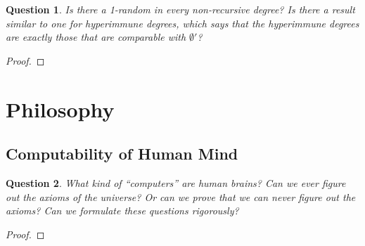 \documentclass{article}
\newtheorem{question}{Question}[subsection]
\begin{document}
    \begin{question}
      Is there a 1-random in every non-recursive degree? Is there a result
      similar to one for hyperimmune degrees, which says that the
      hyperimmune degrees are exactly those that are comparable with
      $\emptyset'$?
    \end{question}
    \begin{proof}
    \end{proof}

\section{Philosophy}
  \subsection{Computability of Human Mind}
    \begin{question}
      What kind of ``computers'' are human brains? Can we ever figure out
      the axioms of the universe? Or can we prove that we can never figure
      out the axioms? Can we formulate these questions rigorously?
    \end{question}
    \begin{proof}
    \end{proof}
\end{document}
